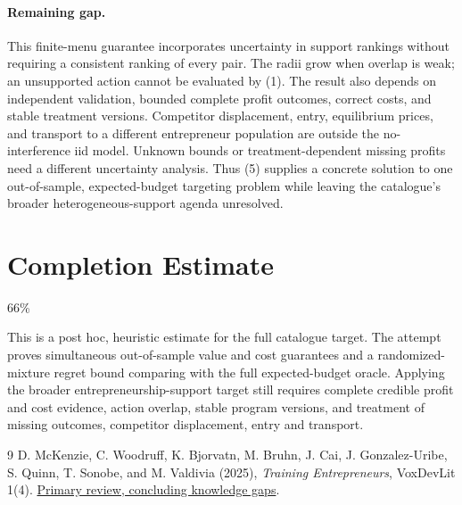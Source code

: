 \documentclass[11pt]{article}
\theoremstyle{definition}
\begin{document}
\paragraph{Remaining gap.}
This finite-menu guarantee incorporates uncertainty in support rankings without requiring a consistent ranking of every pair. The radii grow when overlap is weak; an unsupported action cannot be evaluated by (1). The result also depends on independent validation, bounded complete profit outcomes, correct costs, and stable treatment versions. Competitor displacement, entry, equilibrium prices, and transport to a different entrepreneur population are outside the no-interference iid model. Unknown bounds or treatment-dependent missing profits need a different uncertainty analysis. Thus (5) supplies a concrete solution to one out-of-sample, expected-budget targeting problem while leaving the catalogue's broader heterogeneous-support agenda unresolved.

\section{Completion Estimate}
66\%

This is a post hoc, heuristic estimate for the full catalogue target.
The attempt proves simultaneous out-of-sample value and cost guarantees and a randomized-mixture regret bound comparing with the full expected-budget oracle. Applying the broader entrepreneurship-support target still requires complete credible profit and cost evidence, action overlap, stable program versions, and treatment of missing outcomes, competitor displacement, entry and transport.

\begin{thebibliography}{9}
 D. McKenzie, C. Woodruff, K. Bjorvatn, M. Bruhn, J. Cai, J. Gonzalez-Uribe, S. Quinn, T. Sonobe, and M. Valdivia (2025), \emph{Training Entrepreneurs}, VoxDevLit 1(4). \href{https://voxdev.org/voxdevlit/training-entrepreneurs-issue-4/conclusions-training-entrepreneurs}{Primary review, concluding knowledge gaps}.
\end{thebibliography}
\end{document}

